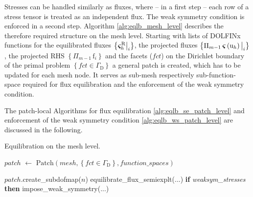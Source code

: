Stresses can be handled similarly as fluxes, where -- in a first step -- each row of a stress tensor is treated as an independent flux. 
The weak symmetry condition is enforced in a second step.
Algorithm \ref{alg:eqlb_mesh_level} describes the therefore required structure on the mesh level.
Starting with lists of DOLFINx functions for the equilibrated fluxes $\left\{\bm{\varsigma}^{\mathrm{R}}_h\big\vert_i\right\}$, the projected fluxes $\left\{\Pi_{m-1}\,\bm{\varsigma}\left(\mathrm{u}_h\right)\big\vert_i\right\}$, the projected RHS $\left\{\Pi_{m-1}\,\mathrm{f}_i\right\}$ and the facets ($fct$) on the Dirichlet boundary of the primal problem $\left\{fct\in\Gamma_\mathrm{D}\right\}$ a general patch is created, which has to be updated for each mesh node.
It serves as sub-mesh respectively sub-function-space required for flux equilibration and the enforcement of the weak symmetry condition.

The patch-local Algorithms for flux equilibration \ref{alg:eqlb_se_patch_level} and enforcement of the weak symmetry condition \ref{alg:eqlb_ws_patch_level} are discussed in the following.
\begin{algorithm}
    \caption{Equilibration on the mesh level.}
    \label{alg:eqlb_mesh_level}



    \BlankLine
    $patch$ $\gets$ $\mathrm{Patch}\left(mesh, \left\{fct\in\Gamma_\mathrm{D}\right\}, function\_spaces\right)$\;

    \BlankLine
    {
        $patch$.create\_subdofmap($n$)\;
        equilibrate\_flux\_semiexplt(...) 
        \textbf{if} \textit{weaksym\_stresses} \textbf{then} impose\_weak\_symmetry(...) 
    }
\end{algorithm}

